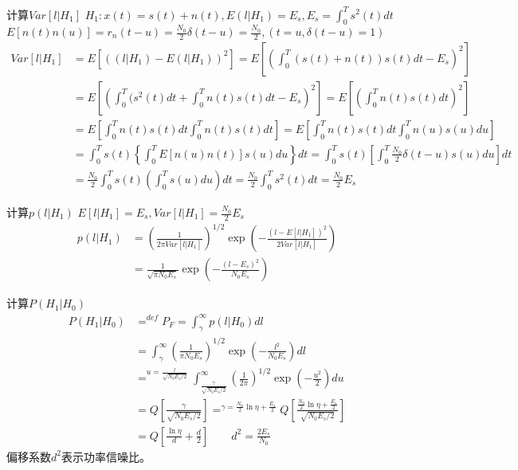 \begin{frame}{计算$Var[l|H_1]$}
$H_1:x(t)=s(t)+n(t), E(l|H_1)=E_s,E_s=\int_{0}^{T}s^2(t)dt$\\
$E[n(t)n(u)]=r_n(t-u)=\frac{N_0}{2}\delta(t-u)=\frac{N_0}{2},(t=u,\delta(t-u)=1)$
\begin{align*}
Var[l|H_1]&=E[((l|H_1)-E(l|H_1))^2]=E\left[\left(\int_{0}^{T}(s(t)+n(t))s(t)dt-E_s\right)^2\right]\\
&=E\left[\left(\int_{0}^{T}(s^2(t)dt+\int_{0}^{T}n(t)s(t)dt-E_s\right)^2\right]=E\left[\left(\int_{0}^{T}n(t)s(t)dt\right)^2\right]\\
&=E\left[\int_{0}^{T}n(t)s(t)dt\int_{0}^{T}n(t)s(t)dt\right]=E\left[\int_{0}^{T}n(t)s(t)dt\int_{0}^{T}n(u)s(u)du\right]\\
&=\int_{0}^{T}s(t)\left\{\int_{0}^{T}E[n(u)n(t)]s(u)du\right\}dt=\int_{0}^{T}s(t)\left[\int_{0}^{T}\frac{N_0}{2}\delta(t-u)s(u)du\right]dt\\
&=\frac{N_0}{2}\int_{0}^{T}s(t)\left(\int_{0}^{T}s(u)du\right)dt=\frac{N_0}{2}\int_{0}^{T}s^2(t)dt=\frac{N_0}{2}E_s
\end{align*}
\end{frame}

\begin{frame}{计算$p(l|H_1)$}
$E[l|H_1]=E_s,Var[l|H_1]=\frac{N_0}{2}E_s$
\begin{align*}
p(l|H_1)&=\left(\frac{1}{2\pi Var[l|H_1]}\right)^{1/2}\exp\left(-\frac{(l-E[l|H_1])^2}{2Var[l|H_1]}\right)\\
&=\frac{1}{\sqrt{\pi N_0E_s}}\exp\left(-\frac{(l-E_s)^2}{N_0E_s}\right)
\end{align*}
\end{frame}

\begin{frame}{计算$P(H_1|H_0)$}
\begin{align*}
P(H_1|H_0)&\mathop{=}^{def}P_F=\int_{\gamma}^{\infty}p(l|H_0)dl\\
&=\int_{\gamma}^{\infty}\left(\frac{1}{\pi N_0E_s}\right)^{1/2}\exp\left(-\frac{l^2}{N_0E_s}\right)dl\\
&\mathop{=}^{u=\frac{l}{\sqrt{N_0E_s/2}}}\int_{\frac{\gamma}{\sqrt{N_0E_s/2}}}^{\infty}\left(\frac{1}{2\pi}\right)^{1/2}\exp\left(-\frac{u^2}{2}\right)du\\
&=Q\left[\frac{\gamma}{\sqrt{N_0E_s/2}}\right]\mathop{=}^{\gamma=\frac{N_0}{2}\ln\eta+\frac{E_s}{2}}Q\left[\frac{\frac{N_0}{2}\ln\eta+\frac{E_s}{2}}{\sqrt{N_0E_s/2}}\right]\\
&=Q\left[\frac{\ln\eta}{d}+\frac{d}{2}\right]\qquad d^2=\frac{2E_s}{N_0}
\end{align*}
偏移系数$d^2$表示功率信噪比。
\end{frame}

